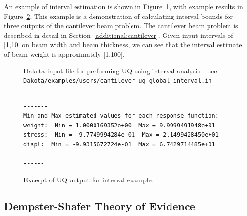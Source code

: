 An example of interval estimation 
is shown in Figure~\ref{uq:examples:interval_input}, with example results in 
Figure~\ref{uq:examples:interval_out}. This example is a demonstration 
of calculating interval bounds for three outputs of the cantilever beam 
problem. The cantilever beam problem is described in detail in 
Section~\ref{additional:cantilever}. Given input intervals of [1,10] on 
beam width and beam thickness, we can see that the interval estimate of 
beam weight is approximately [1,100].

\begin{figure}[htbp!]
  \centering
  \begin{bigbox}
    \begin{small}
    \end{small}
  \end{bigbox}
\caption{Dakota input file for performing UQ using interval analysis --
see \texttt{Dakota/examples/users/cantilever\_uq\_global\_interval.in} }
\label{uq:examples:interval_input}
\end{figure}

\begin{figure}[htbp!]
\centering
\begin{bigbox}
\begin{small}
\begin{verbatim}
------------------------------------------------------------------
Min and Max estimated values for each response function:
weight:  Min = 1.0000169352e+00  Max = 9.9999491948e+01
stress:  Min = -9.7749994284e-01  Max = 2.1499428450e+01
displ:  Min = -9.9315672724e-01  Max = 6.7429714485e+01
-----------------------------------------------------------------
\end{verbatim}
\end{small}
\end{bigbox}
\caption{Excerpt of UQ output for interval example.}
\label{uq:examples:interval_out}
\end{figure}


\subsection{Dempster-Shafer Theory of Evidence}\label{uq:dempshaf}

